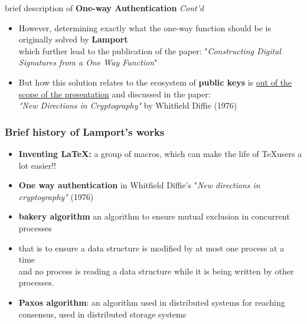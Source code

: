 \documentclass[../document.tex]{subfiles}
\begin{document}

\begin{frame}{brief description of \textbf{One-way Authentication} \textit{Cont'd}}
	\begin{itemize}
		\item <1-1>However, determining exactly what the one-way function should be is originally solved by \textbf{Lamport} \\ which further lead to the publication of the paper: "\textit{Constructing Digital Signatures from a One Way Function}"
		\item<2-> But how this solution relates to the ecosystem of \textbf{public keys} is \underline {out of the scope of the presentation} and discussed in the paper:\\ \textit{"New Directions in Cryptography"} by Whitfield Diffie (1976) 
	\end{itemize}
\end{frame}

\begin{frame}[label=works]
	\frametitle{Brief history of Lamport's works}
	\begin{itemize}
		\item<1-> \textbf{Inventing \LaTeX: }\small a group of macros, which can make the life of \TeX users a lot easier!!
		\item<1-> \textbf{One way authentication} in Whitfield Diffie's "\textit{New directions in cryptography"} (1976)
		\item <1-> \textbf{bakery algorithm} an algorithm to ensure mutual exclusion in concurrent processes
		\item <2->  that is to ensure a data structure is modiﬁed by at most one process at a time
		\\ and no process is reading a data structure while it is being written by other processes. 
		\item <3-> \textbf {Paxos algorithm}: an algorithm used in distributed systems for reaching consensus, used in distributed storage systems
	\end{itemize}
\end{frame}
\end{document}
